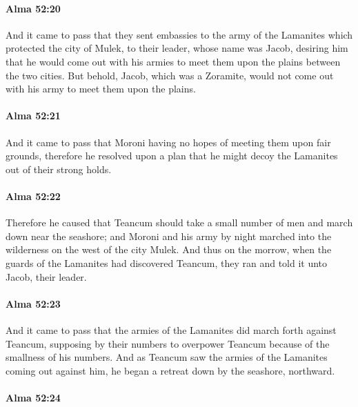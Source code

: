 		\paragraph{Alma 52:20} %
			\label{ALMA-52-20}

			And it came to pass that they sent embassies to the army of the Lamanites
			which protected the city of Mulek,
			to their leader, whose name was Jacob,
			desiring him that he would come out with his armies
			to meet them upon the plains between the two cities.
			But behold, Jacob, which was a Zoramite, would not come out
			with his army to meet them upon the plains.

		\paragraph{Alma 52:21} %
			\label{ALMA-52-21}

			And it came to pass that
			Moroni having no hopes of meeting them upon fair grounds,
			therefore he resolved upon a plan
			that he might decoy the Lamanites out of their strong holds.

		\paragraph{Alma 52:22} %
			\label{ALMA-52-22}

			Therefore he caused that Teancum should take a small number of men
			and march down near the seashore;
			and Moroni and his army by night marched
			into the wilderness on the west of the city Mulek.
			And thus on the morrow,
			when the guards of the Lamanites had discovered Teancum,
			they ran and told it unto Jacob, their leader.

		\paragraph{Alma 52:23} %
			\label{ALMA-52-23}

			And it came to pass that
			the armies of the Lamanites did march forth against Teancum,
			supposing by their numbers to overpower Teancum
			because of the smallness of his numbers.
			And as Teancum saw the armies of the Lamanites coming out against him,
			he began a retreat down by the seashore, northward.

		\paragraph{Alma 52:24} %
			\label{ALMA-52-24}

